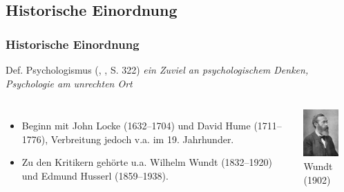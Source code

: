 \documentclass{beamer}
\begin{document}
\subsection{Historische Einordnung}


\begin{frame}
\frametitle{Historische Einordnung \parencite{Moog1919}}

\begin{block}{Def. Psychologismus (\citeauthor{Hoefler1906}, \citeyear{Hoefler1906}, S. 322)}
\centering
\textit{\glqq{}ein Zuviel an psychologischem Denken,\\Psychologie am unrechten Ort\grqq{}}
\end{block}

\vspace{0,6cm}

\begin{columns}
      \begin{itemize}
      \item Beginn mit John Locke (1632--1704) und David Hume (1711--1776), Verbreitung jedoch v.a. im 19. Jahrhunder.
      \item Zu den Kritikern gehörte u.a. Wilhelm Wundt (1832--1920) und Edmund Husserl (1859--1938).
      \end{itemize}
      
      
         \includegraphics[width=0.7\textwidth]{resources/wundt.jpg}
         \\Wundt (1902)
\end{columns}

\end{frame}
\end{document}
